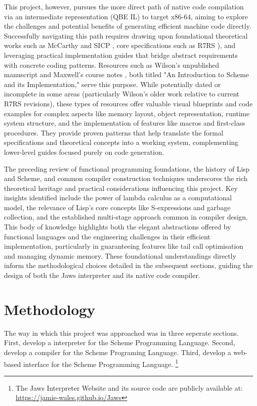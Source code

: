 \documentclass[final]{cmpreport_02}
\begin{document}
This project, however, pursues the more direct path of native code compilation via an intermediate representation (QBE IL) to target x86-64, aiming to explore the challenges and potential benefits of generating efficient machine code directly. Successfully navigating this path requires drawing upon foundational theoretical works such as McCarthy \cite{mccarthy1960recursive} and SICP \cite{structureandinterp}, core specifications such as R7RS \cite{r7rs}), and leveraging practical implementation guides that bridge abstract requirements with concrete coding patterns. Resources such as Wilson's unpublished manuscript \cite{wilson1996introduction} and Maxwell's course notes \cite{intro_scheme}, both titled "An Introduction to Scheme and its Implementation," serve this purpose. While potentially dated or incomplete in some areas (particularly Wilson's older work relative to current R7RS revisions), these types of resources offer valuable visual blueprints and code examples for complex aspects like memory layout, object representation, runtime system structure, and the implementation of features like macros and first-class procedures. They provide proven patterns that help translate the formal specifications and theoretical concepts into a working system, complementing lower-level guides focused purely on code generation.
\newline

The preceding review of functional programming foundations, the history of Lisp and Scheme, and common compiler construction techniques underscores the rich theoretical heritage and practical considerations influencing this project. Key insights identified include the power of lambda calculus as a computational model, the relevance of Lisp's core concepts like S-expressions and garbage collection, and the established multi-stage approach common in compiler design. This body of knowledge highlights both the elegant abstractions offered by functional languages and the engineering challenges in their efficient implementation, particularly in guaranteeing features like tail call optimisation and managing dynamic memory. These foundational understandings directly inform the methodological choices detailed in the subsequent sections, guiding the design of both the Jaws interpreter and its native code compiler.
\section{Methodology}
The way in which this project was approached was in three seperate sections. First, develop a interpreter for the Scheme Programming Language. Second, develop a compiler for the Scheme Programing Language. Third, develop a web-based interface for the Scheme Programming Language. \footnote{The Jaws Interpreter Website and its source code are publicly available at: \url{https://jamie-wales.github.io/Jaws}} \newline
\end{document}
